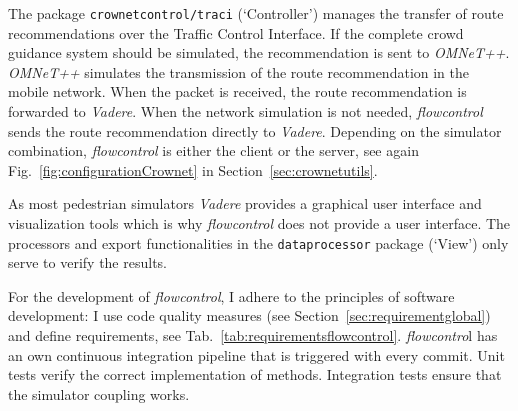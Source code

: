 The package \lstinline{crownetcontrol/traci} (`Controller') manages the transfer of route recommendations over the Traffic Control Interface. If the complete crowd guidance system should be simulated, the recommendation is sent to \textit{OMNeT++}. \textit{OMNeT++} simulates the transmission of the route recommendation in the mobile network. When the packet is received, the route recommendation is forwarded to \textit{Vadere}. When the network simulation is not needed, \textit{flowcontrol} sends the route recommendation directly to \textit{Vadere}. Depending on the simulator combination, \textit{flowcontrol} is either the client or the server, see again Fig.~\ref{fig:configurationCrownet} in Section~\ref{sec:crownetutils}. 

 
As most pedestrian simulators \textit{Vadere} provides a graphical user interface and visualization tools which is why \textit{flowcontrol} does not provide a user interface. The processors and export functionalities in the  \lstinline{dataprocessor} package (`View') only serve to verify the results. 

For the development of \textit{flowcontrol}, I adhere to the principles of software development: I use code quality measures (see Section~\ref{sec:requirementglobal}) and define requirements, see Tab.~\ref{tab:requirementsflowcontrol}. \textit{flowcontro}l has an own continuous integration pipeline that is triggered with every commit. Unit tests verify the correct implementation of methods. Integration tests ensure that the simulator coupling works.





